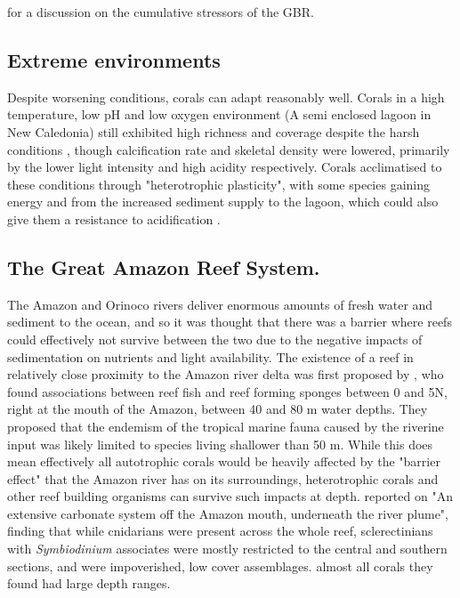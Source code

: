\documentclass[11pt,a4paper]{article}
\begin{document}
\cite{Ortiz2018} for a discussion on the cumulative stressors of the GBR.

\subsection{Extreme environments}
Despite worsening conditions, corals can adapt reasonably well. Corals in a high temperature, low pH and low oxygen environment (A semi enclosed lagoon in New Caledonia) still exhibited high richness and coverage despite the harsh conditions \citep{Camp2017}, though calcification rate and skeletal density were lowered, primarily by the lower light intensity and high acidity respectively. Corals acclimatised to these conditions through "heterotrophic plasticity", with some species gaining energy and from the increased sediment supply to the lagoon, which could also give them a resistance to acidification \citep{Ramajo2016}. 



\subsection{The Great Amazon Reef System.}

The Amazon and Orinoco rivers deliver enormous amounts of fresh water and sediment to the ocean, and so it was thought that there was a barrier where reefs could effectively not survive between the two due to the negative impacts of sedimentation on nutrients and light availability. The existence of a reef in relatively close proximity to the Amazon river delta was first proposed by \cite{collette1977}, who found associations between reef fish and reef forming sponges between 0 and 5\textdegree N, right at the mouth of the Amazon, between 40 and 80 m water depths. They proposed that the endemism of the tropical marine fauna caused by the riverine input was likely limited to species living shallower than 50 m. While this does mean effectively all autotrophic corals would be heavily affected by the "barrier effect" that the Amazon river has on its surroundings, heterotrophic corals and other reef building organisms can survive such impacts at depth. \cite{Moura2016} reported on "An extensive carbonate system off the Amazon mouth, underneath the river plume", finding that while cnidarians were present across the whole reef, sclerectinians with \textit{Symbiodinium} associates were mostly restricted to the central and southern sections, and were impoverished, low cover assemblages. almost all corals they found had large depth ranges.
\end{document}
